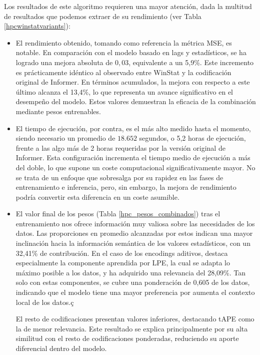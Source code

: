 Los resultados de este algoritmo requieren una mayor atención, dada la multitud de resultados que podemos extraer de su rendimiento (ver Tabla \ref{hpcwinstatvariants}):

\begin{itemize}
	 \item El rendimiento obtenido, tomando como referencia la métrica MSE, es notable. En comparación con el modelo basado en lags y estadísticos, se ha logrado una mejora absoluta de $0,03$, equivalente a un 5,9\%. Este incremento es prácticamente idéntico al observado entre {WinStat} y la codificación original de {Informer}. En términos acumulados, la mejora con respecto a este último alcanza el 13,4\%, lo que representa un avance significativo en el desempeño del modelo. Estos valores demuestran la eficacia de la combinación mediante pesos entrenables.
	\item El tiempo de ejecución, por contra, es el más alto medido hasta el momento, siendo necesario un promedio de $18.652$ segundos, o 5,2 horas de ejecución, frente a las algo más de 2 horas requeridas por la versión original de Informer. Esta configuración incrementa el tiempo medio de ejecución a más del doble, lo que supone un coste computacional significativamente mayor. No se trata de un enfoque que sobresalga por su rapidez en las fases de entrenamiento e inferencia, pero, sin embargo, la mejora de rendimiento podría convertir esta diferencia en un coste asumible.
	\item El valor final de los pesos (Tabla \ref{hpc_pesos_combinados}) tras el entrenamiento nos ofrece información muy valiosa sobre las necesidades de los datos. Las proporciones en promedio alcanzadas por estos indican una mayor inclinación hacia la información semántica de los valores estadísticos, con un 32,41\% de contribución. En el caso de los encodings aditivos, destaca especialmente la componente aprendida por LPE, la cual se adapta lo máximo posible a los datos, y ha adquirido una relevancia del 28,09\%. Tan solo con estas componentes, se cubre una ponderación de 0,605 de los datos, indicando que el modelo tiene una mayor preferencia por aumenta el contexto local de los datos.ç
	
	 El resto de codificaciones presentan valores inferiores, destacando tAPE como la de menor relevancia. Este resultado se explica principalmente por su alta similitud con el resto de codificaciones ponderadas, reduciendo su aporte diferencial dentro del modelo.
	
\end{itemize}

